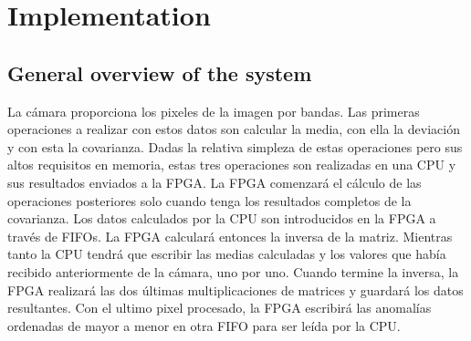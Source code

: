 
\cleardoublepage

\chapter{Implementation}
\label{makereference}

\section{General overview of the system}
La cámara proporciona los pixeles de la imagen por bandas. Las primeras operaciones a realizar con estos datos son calcular la media, con ella la deviación y con esta la covarianza. Dadas la relativa simpleza de estas operaciones pero sus altos requisitos en memoria, estas tres operaciones son realizadas en una CPU y sus resultados enviados a la FPGA. La FPGA comenzará el cálculo de las operaciones posteriores solo cuando tenga los resultados completos de la covarianza.
Los datos calculados por la CPU son introducidos en la FPGA a través de FIFOs.
La FPGA calculará entonces la inversa de la matriz. Mientras tanto la CPU tendrá que escribir las medias calculadas y los valores que había recibido anteriormente de la cámara, uno por uno. Cuando termine la inversa, la FPGA realizará las dos últimas multiplicaciones de matrices y guardará los datos resultantes. Con el ultimo pixel procesado, la FPGA escribirá las anomalías ordenadas de mayor a menor en otra FIFO para ser leída por la CPU.

\pagebreak

